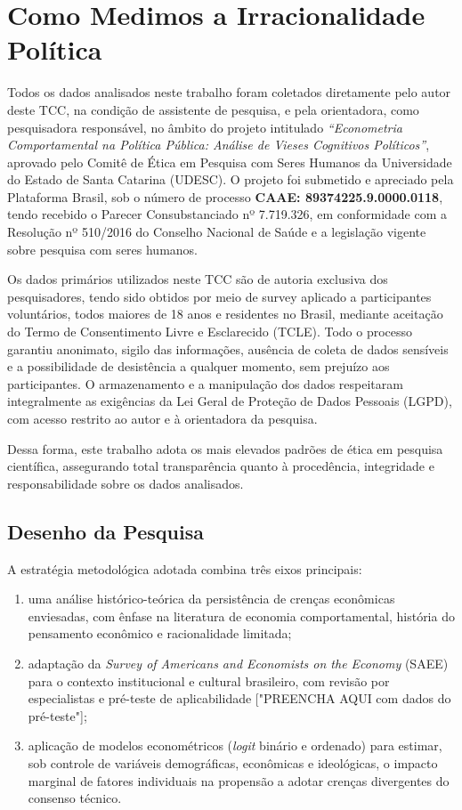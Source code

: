 \chapter{Como Medimos a Irracionalidade Política}

Todos os dados analisados neste trabalho foram coletados diretamente pelo autor deste TCC, na condição de assistente de pesquisa, e pela orientadora, como pesquisadora responsável, no âmbito do projeto intitulado \textit{“Econometria Comportamental na Política Pública: Análise de Vieses Cognitivos Políticos”}, aprovado pelo Comitê de Ética em Pesquisa com Seres Humanos da Universidade do Estado de Santa Catarina (UDESC). O projeto foi submetido e apreciado pela Plataforma Brasil, sob o número de processo \textbf{CAAE: 89374225.9.0000.0118}, tendo recebido o Parecer Consubstanciado nº 7.719.326, em conformidade com a Resolução nº 510/2016 do Conselho Nacional de Saúde e a legislação vigente sobre pesquisa com seres humanos.

Os dados primários utilizados neste TCC são de autoria exclusiva dos pesquisadores, tendo sido obtidos por meio de survey aplicado a participantes voluntários, todos maiores de 18 anos e residentes no Brasil, mediante aceitação do Termo de Consentimento Livre e Esclarecido (TCLE). Todo o processo garantiu anonimato, sigilo das informações, ausência de coleta de dados sensíveis e a possibilidade de desistência a qualquer momento, sem prejuízo aos participantes. O armazenamento e a manipulação dos dados respeitaram integralmente as exigências da Lei Geral de Proteção de Dados Pessoais (LGPD), com acesso restrito ao autor e à orientadora da pesquisa.

Dessa forma, este trabalho adota os mais elevados padrões de ética em pesquisa científica, assegurando total transparência quanto à procedência, integridade e responsabilidade sobre os dados analisados.

\section{Desenho da Pesquisa}

A estratégia metodológica adotada combina três eixos principais:
\begin{enumerate}[label=\alph*)]
    \item uma análise histórico-teórica da persistência de crenças econômicas enviesadas, com ênfase na literatura de economia comportamental, história do pensamento econômico e racionalidade limitada;
    \item adaptação da \textit{Survey of Americans and Economists on the Economy} (SAEE) para o contexto institucional e cultural brasileiro, com revisão por especialistas e pré-teste de aplicabilidade ["PREENCHA AQUI com dados do pré-teste"];
    \item aplicação de modelos econométricos (\textit{logit} binário e ordenado) para estimar, sob controle de variáveis demográficas, econômicas e ideológicas, o impacto marginal de fatores individuais na propensão a adotar crenças divergentes do consenso técnico.
\end{enumerate}

